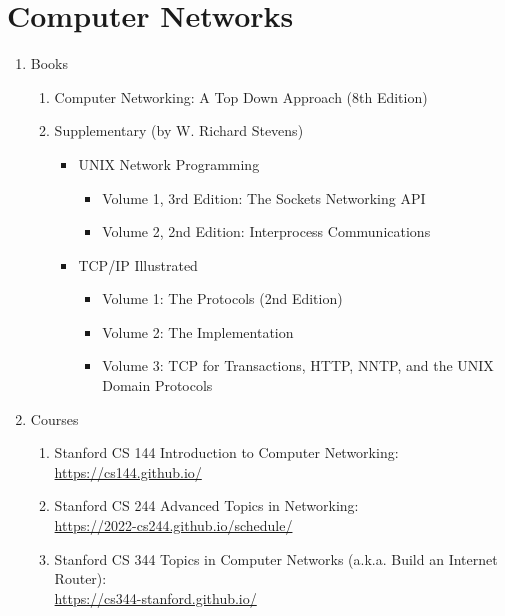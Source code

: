 \documentclass{article}
\begin{document}
\section{Computer Networks}
\begin{enumerate}
    \item Books
    \begin{enumerate}
        \item Computer Networking: A Top Down Approach (8th Edition) \cite{kurosecomputer}
        \item Supplementary (by W. Richard Stevens)
        \begin{itemize}
            \item UNIX Network Programming
            \begin{itemize}
                \item Volume 1, 3rd Edition: The Sockets Networking API \cite{stevens2018unixvolume1}
                \item Volume 2, 2nd Edition: Interprocess Communications \cite{richard1999unixvolume2}
            \end{itemize}
            \item TCP/IP Illustrated
            \begin{itemize}
                \item Volume 1: The Protocols (2nd Edition) \cite{fall2011tcp}
                \item Volume 2: The Implementation \cite{stevens1996tcp}
                \item Volume 3: TCP for Transactions, HTTP, NNTP, and the UNIX Domain Protocols \cite{stevens2000tcp}
            \end{itemize}
        \end{itemize}        
    \end{enumerate}
    
    \item Courses
    \begin{enumerate}
        \item Stanford CS 144 Introduction to Computer Networking:
        \href{https://cs144.github.io/}{https://cs144.github.io/}
        \item Stanford CS 244 Advanced Topics in Networking:\\
        \href{https://2022-cs244.github.io/schedule/}{https://2022-cs244.github.io/schedule/}
        \item Stanford CS 344 Topics in Computer Networks (a.k.a. Build an Internet Router):\\
        \href{https://cs344-stanford.github.io/}{https://cs344-stanford.github.io/}
    \end{enumerate}


\end{enumerate}
\end{document}
